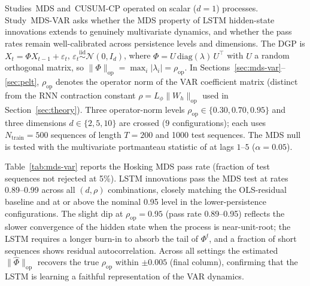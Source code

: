 \documentclass[bj,authoryear]{imsart}
\theoremstyle{plain}
\theoremstyle{definition}
\begin{document}
Studies~MDS and~CUSUM-CP operated on scalar ($d=1$) processes.
Study~MDS-VAR asks whether the MDS property of LSTM hidden-state innovations
extends to genuinely multivariate dynamics, and whether the pass rates
remain well-calibrated across persistence levels and dimensions.
The DGP is $X_t = \Phi X_{t-1} + \varepsilon_t$,
$\varepsilon_t \overset{\text{iid}}{\sim}\mathcal{N}(0,I_d)$,
where $\Phi = U\,\mathrm{diag}(\lambda)\,U^\top$ with $U$ a random
orthogonal matrix, so $\|\Phi\|_{\mathrm{op}} = \max_i|\lambda_i| = \rho_{\mathrm{op}}$.
In Sections~\ref{sec:mds-var}--\ref{sec:pelt}, $\rho_{\mathrm{op}}$ denotes the
operator norm of the VAR coefficient matrix (distinct from the RNN contraction
constant $\rho = L_\phi\|W_h\|_{\mathrm{op}}$ used in Section~\ref{sec:theory}).
Three operator-norm levels $\rho_{\mathrm{op}} \in \{0.30, 0.70, 0.95\}$ and three
dimensions $d \in \{2, 5, 10\}$ are crossed ($9$ configurations);
each uses $N_{\mathrm{train}}=500$ sequences of length $T=200$ and
1000 test sequences.
The MDS null is tested with the multivariate portmanteau statistic of
\citet{hosking1980multivariate} at lags $1$--$5$ ($\alpha=0.05$).

Table~\ref{tab:mds-var} reports the Hosking MDS pass rate (fraction of test
sequences not rejected at 5\%).
LSTM innovations pass the MDS test at rates 0.89--0.99 across all
$(d, \rho)$ combinations, closely matching the OLS-residual baseline
and at or above the nominal 0.95 level in the lower-persistence
configurations.
The slight dip at $\rho_{\mathrm{op}}=0.95$ (pass rate 0.89--0.95) reflects
the slower convergence of the hidden state when the process is near-unit-root;
the LSTM requires a longer burn-in to absorb the tail of $\Phi^t$, and a
fraction of short sequences shows residual autocorrelation.
Across all settings the estimated $\|\hat{\Phi}\|_{\mathrm{op}}$ recovers
the true $\rho_{\mathrm{op}}$ within $\pm 0.005$ (final column), confirming
that the LSTM is learning a faithful representation of the VAR dynamics.
\end{document}
